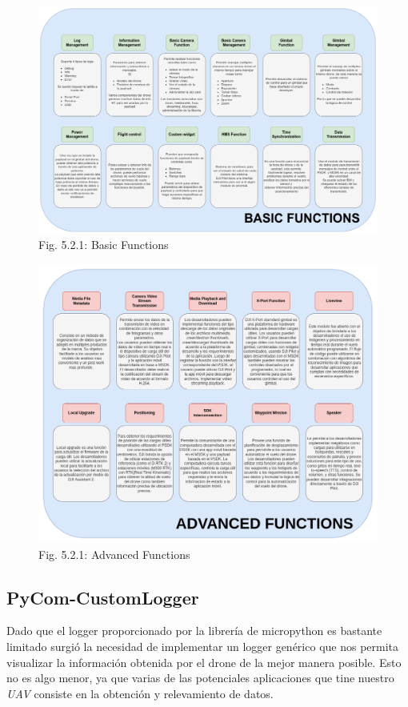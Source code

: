 \documentclass[12pt]{article}
\begin{document}
\begin{figure}
\centering
  \includegraphics[width=\linewidth]{images/basic_function.png}
  \caption{Fig. 5.2.1: Basic Functions}
\end{figure}
\begin{figure}
\centering
\includegraphics[width=\linewidth]{images/advanced_function.png}
  \caption{Fig. 5.2.1: Advanced Functions}
\end{figure}

\FloatBarrier
\subsection{PyCom-CustomLogger}
Dado que el logger proporcionado por la librería de micropython es bastante limitado surgió la necesidad de implementar un logger genérico que nos permita visualizar la información obtenida por el drone de la mejor manera posible. Esto no es algo menor, ya que varias de las potenciales aplicaciones que tine nuestro \textit{UAV} consiste en la obtención y relevamiento de datos.
\end{document}
